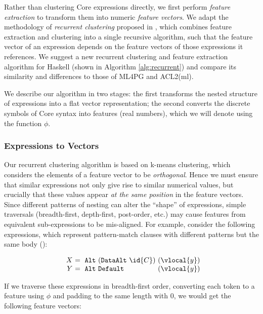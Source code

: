 Rather than clustering Core expressions directly, we first perform \emph{feature
  extraction} to transform them into numeric \emph{feature vectors}. We adapt
the methodology of \emph{recurrent clustering} proposed in
\cite{DBLP:journals/corr/HerasK14} \cite{heras2013proof}, which combines feature
extraction and clustering into a single recursive algorithm, such that the
feature vector of an expression depends on the feature vectors of those
expressions it references. We suggest a new recurrent clustering and feature
extraction algorithm for Haskell (shown in Algorithm \ref{alg:recurrent}) and
compare its similarity and differences to those of ML4PG and ACL2(ml).

We describe our algorithm in two stages: the first transforms the nested
structure of expressions into a flat vector representation; the second converts
the discrete symbols of Core syntax into features (real numbers), which we will
denote using the function $\phi$.

\subsubsection{Expressions to Vectors}
\label{sec:expressionstovectors}

Our recurrent clustering algorithm is based on k-means clustering, which
considers the elements of a feature vector to be \emph{orthogonal}. Hence we
must ensure that similar expressions not only give rise to similar numerical
values, but crucially that these values appear \emph{at the same position} in
the feature vectors. Since different patterns of nesting can alter the ``shape''
of expressions, simple traversals (breadth-first, depth-first, post-order, etc.)
may cause features from equivalent sub-expressions to be mis-aligned. For
example, consider the following expressions, which represent pattern-match
clauses with different patterns but the same body ():

\begin{equation}\label{eq:xy}
  \begin{array}{r@{}l@{}l@{}}
    X\ &=\ \CAlt\ (\CDataAlt\ \id{C})\ & (\vlocal{y}) \\
    Y\ &=\ \CAlt\ \CDefault\           & (\vlocal{y})
  \end{array}
\end{equation}

If we traverse these expressions in breadth-first order, converting each token
to a feature using $\phi$ and padding to the same length with $0$, we would get
the following feature vectors:

